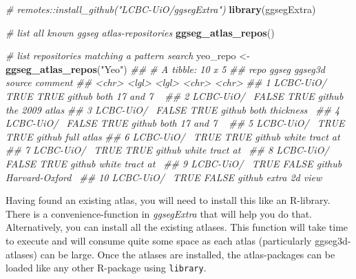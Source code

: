 \documentclass[fleqn,10pt]{wlpeerj} %
\newenvironment{Shaded}{\begin{snugshade}}{\end{snugshade}}
\newcommand{\CommentTok}[1]{\textcolor[rgb]{0.56,0.35,0.01}{\textit{#1}}}
\newcommand{\KeywordTok}[1]{\textcolor[rgb]{0.13,0.29,0.53}{\textbf{#1}}}
\newcommand{\NormalTok}[1]{#1}
\newcommand{\OperatorTok}[1]{\textcolor[rgb]{0.81,0.36,0.00}{\textbf{#1}}}
\newcommand{\StringTok}[1]{\textcolor[rgb]{0.31,0.60,0.02}{#1}}
\begin{document}
\begin{Shaded}
\begin{Highlighting}[]
\CommentTok{# remotes::install_github("LCBC-UiO/ggsegExtra")}
\KeywordTok{library}\NormalTok{(ggsegExtra)}

\CommentTok{# list all known ggseg atlas-repositories}
\KeywordTok{ggseg_atlas_repos}\NormalTok{()}

\CommentTok{# list repositories matching a pattern search}
\NormalTok{yeo_repo <-}\StringTok{ }\KeywordTok{ggseg_atlas_repos}\NormalTok{(}\StringTok{"Yeo"}\NormalTok{)}
\CommentTok{## # A tibble: 10 x 5}
\CommentTok{##    repo       ggseg ggseg3d source comment        }
\CommentTok{##    <chr>      <lgl> <lgl>   <chr>  <chr>          }
\CommentTok{##  1 LCBC-UiO/~ TRUE  TRUE    github both 17 and 7 ~}
\CommentTok{##  2 LCBC-UiO/~ FALSE TRUE    github the 2009 atlas }
\CommentTok{##  3 LCBC-UiO/~ FALSE TRUE    github both thickness~}
\CommentTok{##  4 LCBC-UiO/~ FALSE TRUE    github both 17 and 7 ~}
\CommentTok{##  5 LCBC-UiO/~ TRUE  TRUE    github full atlas     }
\CommentTok{##  6 LCBC-UiO/~ TRUE  TRUE    github white tract at~}
\CommentTok{##  7 LCBC-UiO/~ TRUE  TRUE    github white tract at~}
\CommentTok{##  8 LCBC-UiO/~ FALSE TRUE    github white tract at~}
\CommentTok{##  9 LCBC-UiO/~ TRUE  FALSE   github Harvard-Oxford~}
\CommentTok{## 10 LCBC-UiO/~ TRUE  FALSE   github extra 2d view ~}
\end{Highlighting}
\end{Shaded}

Having found an existing atlas, you will need to install this like an R-library.
There is a convenience-function in \emph{ggsegExtra} that will help you do that.
Alternatively, you can install all the existing atlases.
This function will take time to execute and will consume quite some space as each atlas (particularly ggseg3d-atlases) can be large.
Once the atlases are installed, the atlas-packages can be loaded like any other R-package using \texttt{library}.

\begin{Shaded}
\end{Shaded}
\end{document}
